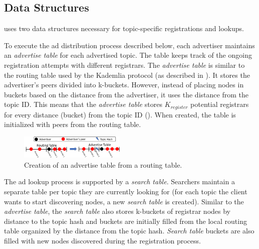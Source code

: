 \subsection{Data Structures}\label{sec:struct}
\sysname uses two data structures necessary for topic-specific registrations and lookups. 

To execute the ad distribution process described below, each advertiser maintains an \emph{advertise table} for each advertised topic. The table keeps track of the ongoing registration attempts with different registrars. The \emph{advertise table} is similar to the routing table used by the Kademlia protocol (as described in ). It stores the advertiser's peers divided into k-buckets. However, instead of placing nodes in buckets based on the distance from the advertiser, it uses the distance from the topic ID. This means that the \emph{advertise table} stores $K_\textit{register}$ potential registrars for every distance (bucket) from the topic ID (). When created, the table is initialized with peers from the routing table. 

\begin{figure}
    \includegraphics[width=0.45\textwidth]{img/tables}
    \vspace{-0.05in}
    \caption{Creation of an advertise table from a routing table.} %
    \label{fig:advertise_table}
    \vspace{-0.15in}
 \end{figure}

The ad lookup process is supported by a \emph{search table}. 
Searchers maintain a separate table per topic they are currently looking for (\ie for each topic the client wants to start discovering nodes, a new \emph{search table} is created). 
Similar to the \emph{advertise table}, the \emph{search table} also stores k-buckets of registrar nodes by distance to the topic hash  and buckets are initially filled from the local routing table organized by the distance from the topic hash.
\emph{Search table} buckets are also filled with new nodes discovered during the registration process.


